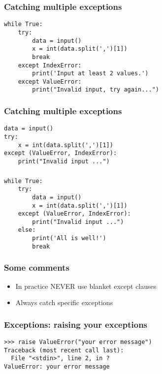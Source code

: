 \documentclass[14pt,compress]{beamer}
\begin{document}
\begin{frame}[fragile]
  \frametitle{Catching multiple exceptions}
  \small
\begin{lstlisting}
while True:
    try:
        data = input()
        x = int(data.split(',')[1])
        break
    except IndexError:
        print('Input at least 2 values.')
    except ValueError:
        print("Invalid input, try again...")

\end{lstlisting}
\end{frame}


\begin{frame}[fragile]
  \frametitle{Catching multiple exceptions}
\begin{lstlisting}
data = input()
try:
    x = int(data.split(',')[1])
except (ValueError, IndexError):
    print("Invalid input ...")

\end{lstlisting}
\end{frame}

\begin{frame}[fragile]
  \frametitle{}
  \small
\begin{lstlisting}
while True:
    try:
        data = input()
        x = int(data.split(',')[1])
    except (ValueError, IndexError):
        print("Invalid input ...")
    else:
        print('All is well!')
        break
  \end{lstlisting}

\end{frame}


\begin{frame}
  \frametitle{Some comments}
  \begin{itemize}
  \item In practice NEVER use blanket except clauses
  \item Always catch specific exceptions
  \end{itemize}
\end{frame}

\begin{frame}[fragile]
  \frametitle{Exceptions: raising your exceptions}
\small
\begin{lstlisting}
>>> raise ValueError("your error message")
Traceback (most recent call last):
  File "<stdin>", line 2, in ?
ValueError: your error message
\end{lstlisting}
\end{frame}
\end{document}
